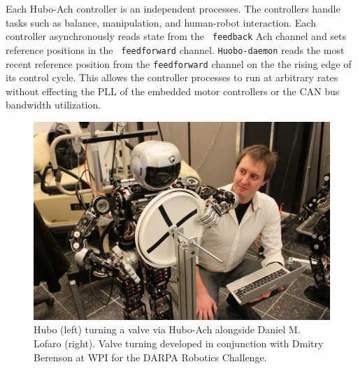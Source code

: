 Each Hubo-Ach controller is an independent processes.  The controllers
handle tasks such as balance, manipulation, and human-robot
interaction.  Each controller asynchronously reads state from the {\tt
  feedback} Ach channel and sets reference positions in the {\tt
  feedforward} channel.  {\tt Huobo-daemon} reads the most recent
reference position from the {\tt feedforward} channel on the the
rising edge of its control cycle.  This allows the controller
processes to run at arbitrary rates without effecting the PLL of the
embedded motor controllers or the CAN bus bandwidth utilization.


\begin{figure}[thpb]
  \centering
      \includegraphics[width=0.93\columnwidth]{./pix/IMG_9107-small.jpg}
\caption{Hubo (left) turning a valve via Hubo-Ach alongside Daniel
  M. Lofaro (right).  Valve turning developed in conjunction with
  Dmitry Berenson at WPI for the DARPA Robotics Challenge.}
  \label{fig:valve}
\end{figure}

